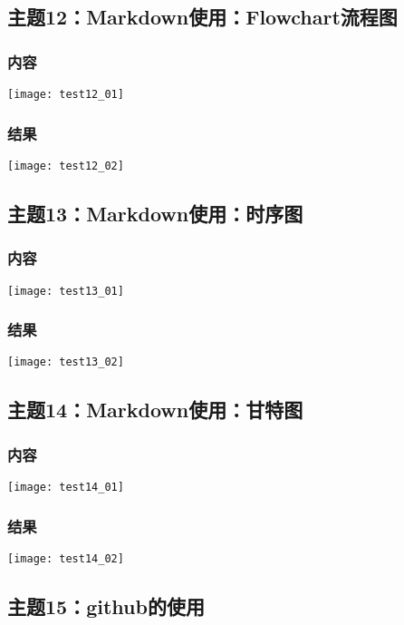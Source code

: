\documentclass{article}
\begin{document}
\subsection{主题12：Markdown使用：Flowchart流程图}  
\subsubsection{内容}
\texttt{[image: test12\_01]}\\  
\subsubsection{结果}  
\texttt{[image: test12\_02]}\\  
\vspace{1cm}
\subsection{主题13：Markdown使用：时序图}  
\subsubsection{内容}
\texttt{[image: test13\_01]}\\ 
\subsubsection{结果}  
\texttt{[image: test13\_02]}\\ 
\vspace{1cm}
\subsection{主题14：Markdown使用：甘特图}  
\subsubsection{内容}
\texttt{[image: test14\_01]}\\ 
\subsubsection{结果}  
\texttt{[image: test14\_02]}\\ 
\newpage
\thispagestyle{empty}
\subsection{主题15：github的使用}  
\end{document}
